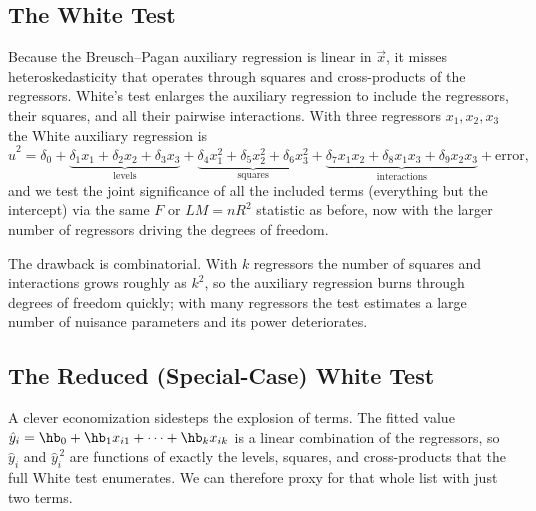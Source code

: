
\subsection{The White Test}

Because the Breusch--Pagan auxiliary regression is linear in $\vec x$, it misses heteroskedasticity that operates through squares and cross-products of the regressors. White's test enlarges the auxiliary regression to include the regressors, their squares, and all their pairwise interactions. With three regressors $x_1, x_2, x_3$ the White auxiliary regression is
\[
\hat u^2 = \delta_0 + \underbrace{\delta_1 x_1 + \delta_2 x_2 + \delta_3 x_3}_{\text{levels}}
+ \underbrace{\delta_4 x_1^2 + \delta_5 x_2^2 + \delta_6 x_3^2}_{\text{squares}}
+ \underbrace{\delta_7 x_1 x_2 + \delta_8 x_1 x_3 + \delta_9 x_2 x_3}_{\text{interactions}} + \text{error},
\]
and we test the joint significance of all the included terms (everything but the intercept) via the same $F$ or $LM = nR^2$ statistic as before, now with the larger number of regressors driving the degrees of freedom.

The drawback is combinatorial. With $k$ regressors the number of squares and interactions grows roughly as $k^2$, so the auxiliary regression burns through degrees of freedom quickly; with many regressors the test estimates a large number of nuisance parameters and its power deteriorates.

\subsection{The Reduced (Special-Case) White Test}

A clever economization sidesteps the explosion of terms. The fitted value $\hat y_i = \hb_0 + \hb_1 x_{i1} + \dots + \hb_k x_{ik}$ is a linear combination of the regressors, so $\hat y_i$ and $\hat y_i^{\,2}$ are functions of exactly the levels, squares, and cross-products that the full White test enumerates. We can therefore proxy for that whole list with just two terms.

